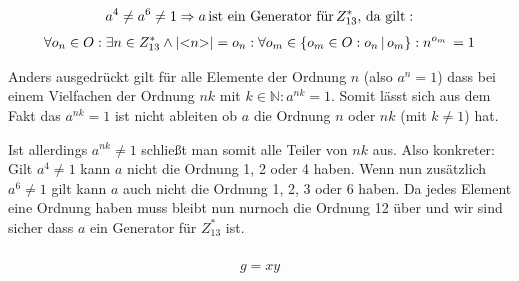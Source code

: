 \documentclass{article}
\begin{document}
\begin{align*}
	a^4 \neq a^6 \neq 1 \Rightarrow a\, \textnormal{ist ein Generator für}\, Z_{13}^*,\, \textnormal{da gilt}:
\end{align*}
\begin{align*}
	\forall o_n \in O: \exists n \in Z_{13}^* \land \textnormal{|<}n\textnormal{>|} = o_n: \forall o_m \in \{ o_m \in O: o_n \,|\, o_m \}: n^{o_m}\, = 1
\end{align*}

Anders ausgedrückt gilt für alle Elemente der Ordnung $n$ (also $a^n = 1$) dass
bei einem Vielfachen der Ordnung $nk$ mit $k \in \mathbb{N}: a^{nk} = 1$. Somit
lässt sich aus dem Fakt das $a^{nk} = 1$ ist nicht ableiten ob $a$ die Ordnung
$n$ oder $nk$ (mit $k \neq 1$) hat.

Ist allerdings $a^{nk} \neq 1$ schließt man somit alle Teiler von $nk$ aus.
Also konkreter: Gilt $a^4 \neq 1$ kann $a$ nicht die Ordnung 1, 2 oder 4
haben. Wenn nun zusätzlich $a^6 \neq 1$ gilt kann $a$ auch nicht die Ordnung 1,
2, 3 oder 6 haben. Da jedes Element eine Ordnung haben muss bleibt nun nurnoch
die Ordnung 12 über und wir sind sicher dass $a$ ein Generator für $Z_{13}^*$
ist.


\subsubsection{}

\begin{align*}
	g = xy
\end{align*}
\end{document}
